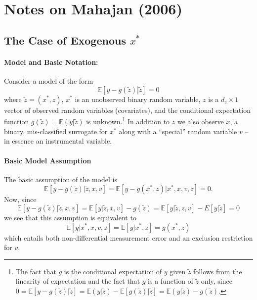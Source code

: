 \documentclass[12pt]{article}
\begin{document}

\section{Notes on Mahajan (2006)}


\subsection{The Case of Exogenous $x^*$}
\paragraph{Model and Basic Notation:}
Consider a model of the form
\begin{equation}
  \mathbb{E}\left[ y - g(\widetilde{z})\left. \right| \widetilde{z} \right] = 0
  \label{eq:mahajanI}
\end{equation}
where $\widetilde{z} = (x^*, z)$, $x^*$ is an unobserved binary random variable, $z$ is  a $d_z\times 1$ vector of observed random variables (covariates), and the conditional expectation function $g(\widetilde{z}) = \mathbb{E}(y|\widetilde{z})$ is unknown.\footnote{The fact that $g$ is the conditional expectation of $y$ given $\widetilde{z}$ follows from the linearity of expectation and the fact that $g$ is a function of $\widetilde{z}$ only, since $0 = \mathbb{E}[y - g(\widetilde{z})|\widetilde{z}] = \mathbb{E}(y|\widetilde{z}) - \mathbb{E}[g(\widetilde{z})|\widetilde{z}] = \mathbb{E}(y|\widetilde{z}) - g(\widetilde{z})$.}
In addition to $z$ we also observe $x$, a binary, mis-classified surrogate for $x^*$ along with a ``special'' random variable $v$ -- in essence an instrumental variable.

\paragraph{Basic Model Assumption}
The basic assumption of the model is
\begin{equation}
  \mathbb{E}[y - g(\widetilde{z}) | \widetilde{z}, x, v] = \mathbb{E}[y - g(x^*,z) |x^*, x, v,z] = 0.
  \label{eq:mahajan1}
\end{equation}
Now, since
\[
  \mathbb{E}[y - g(\widetilde{z}) | \widetilde{z}, x, v] =
  \mathbb{E}[y| \widetilde{z}, x, v] - g(\widetilde{z}) = \mathbb{E}[y|\widetilde{z},z,v] - E[y|\widetilde{z}] = 0
\]
we see that this assumption is equivalent to 
\[
  \mathbb{E}[y|x^*,x,v,z] = \mathbb{E}[y|x^*,z] = g(x^*,z)
\]
which entails both non-differential measurement error and an exclusion restriction for $v$.
\end{document}
